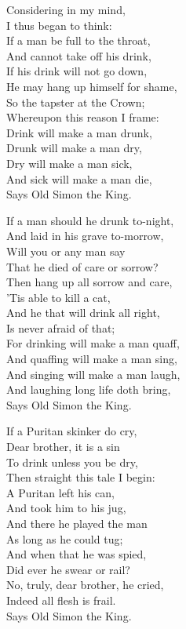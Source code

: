 \begin{dcverse}\begin{patverse}
Considering in my mind,\\
I thus began to think:\\
If a man be full to the throat,\\
And cannot take off his drink,\\
If his drink will not go down,\\
He may hang up himself for shame,\\
So the tapster at the Crown;\\
Whereupon this reason I frame:\\
Drink will make a man drunk,\\
Drunk will make a man dry,\\
Dry will make a man sick,\\
And sick will make a man die,\\
Says Old Simon the King.
\end{patverse}

\begin{patverse}
If a man should he drunk to-night,\\
And laid in his grave to-morrow,\\
Will you or any man say\\
That he died of care or sorrow?\\
Then hang up all sorrow and care,\\
’Tis able to kill a cat,\\
\columnbreak
And he that will drink all right,\\
Is never afraid of that;\\
For drinking will make a man quaff,\\
And quaffing will make a man sing,\\
And singing will make a man laugh,\\
And laughing long life doth bring,\\
Says Old Simon the King.
\end{patverse}

\begin{patverse}
If a Puritan skinker do cry,\\
Dear brother, it is a sin\\
To drink unless you be dry,\\
Then straight this tale I begin:\\
A Puritan left his can,\\
And took him to his jug,\\
And there he played the man\\
As long as he could tug;\\
And when that he was spied,\\
Did ever he swear or rail?\\
No, truly, dear brother, he cried,\\
Indeed all flesh is frail.\\
Says Old Simon the King.
\end{patverse}
\end{dcverse}
\pagebreak


